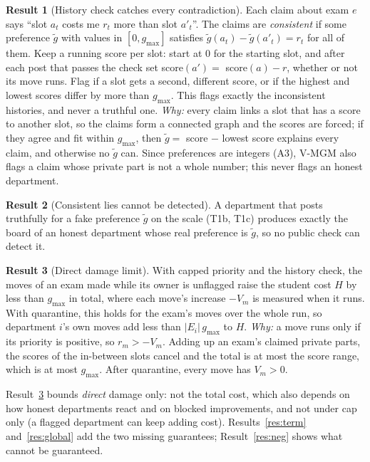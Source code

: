 \documentclass{article}
\theoremstyle{definition}
\newtheorem{result}{Result}
\newcommand{\1}{\mathbf{1}}
\newcommand{\gmax}{g_{\max}}
\begin{document}
\begin{result}[History check catches every contradiction]
\label{res:hist}
Each claim about exam $e$ says ``slot $a_t$ costs me $r_t$ more than slot $a'_t$''. The claims are \emph{consistent} if some preference $\tilde g$ with values in $[0,\gmax]$ satisfies $\tilde g(a_t)-\tilde g(a'_t)=r_t$ for all of them. Keep a running score per slot: start at $0$ for the starting slot, and after each post that passes the check set score$(a')=$ score$(a)-r$, whether or not its move runs.
Flag if a slot gets a second, different score, or if the highest and lowest scores differ by more than $\gmax$. This flags exactly the inconsistent histories, and never a truthful one. \emph{Why:} every claim links a slot that has a score to another slot, so the claims form a connected graph and the scores are forced; if they agree and fit within $\gmax$, then $\tilde g=$ score $-$ lowest score explains every claim, and otherwise no $\tilde g$ can. Since preferences are integers (A3), V-MGM also flags a claim whose private part is not a whole number; this never flags an honest department.
\end{result}

\begin{result}[Consistent lies cannot be detected]
\label{res:undet}
A department that posts truthfully for a fake preference $\tilde g$ on the scale (T1b, T1c) produces exactly the board of an honest department whose real preference is $\tilde g$, so no public check can detect it.
\end{result}

\begin{result}[Direct damage limit]
\label{res:bound}
With capped priority and the history check, the moves of an exam made while its owner is unflagged raise the student cost $H$ by less than $\gmax$ in total, where each move's increase $-V_m$ is measured when it runs. With quarantine, this holds for the exam's moves over the whole run, so department $i$'s own moves add less than $|E_i|\,\gmax$ to $H$. \emph{Why:} a move runs only if its priority is positive, so $r_m>-V_m$. Adding up an exam's claimed private parts, the scores of the in-between slots cancel and the total is at most the score range, which is at most $\gmax$. After quarantine, every move has $V_m>0$.
\end{result}
Result~\ref{res:bound} bounds \emph{direct} damage only: not the total cost, which also depends on how honest departments react and on blocked improvements, and not under cap only (a flagged department can keep adding cost). Results~\ref{res:term} and~\ref{res:global} add the two missing guarantees; Result~\ref{res:neg} shows what cannot be guaranteed.
\end{document}
